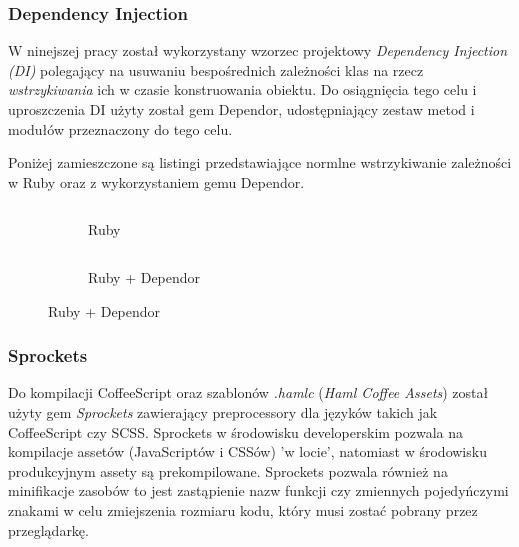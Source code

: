 \documentclass[11pt,a4paper, twoside]{article}
\begin{document}
\subsubsection{Dependency Injection}
W ninejszej pracy został wykorzystany wzorzec projektowy \emph{Dependency Injection (DI)} polegający na usuwaniu bespośrednich zależności klas na rzecz \emph{wstrzykiwania} ich w czasie konstruowania obiektu. Do osiągnięcia tego celu i uproszczenia  DI użyty został gem Dependor, udostępniający zestaw metod i modułów przeznaczony do tego celu.

Poniżej zamieszczone są listingi przedstawiające normlne wstrzykiwanie zależności w Ruby oraz z wykorzystaniem gemu Dependor.
\newline


\begin{figure}[H]
\centering
\begin{subfigure}[t]{0.45\textwidth}
\caption{Ruby}
\begin{listing}[H]
\inputminted[linenos=true]{ruby}{./src/di_ruby.rb}
\end{listing}
\end{subfigure}
\begin{subfigure}[t]{0.45\textwidth}
\caption{Ruby + Dependor}
\begin{listing}[H]
\inputminted{ruby}{./src/di_dependor.rb}
\end{listing}
\end{subfigure}
\end{figure}
\subsubsection{Sprockets}
Do kompilacji CoffeeScript oraz szablonów \emph{.hamlc} (\emph{Haml Coffee Assets}) został użyty gem \emph{Sprockets} zawierający preprocessory dla języków takich jak CoffeeScript czy SCSS. Sprockets w środowisku developerskim pozwala na kompilacje assetów (JavaScriptów i CSSów) 'w locie', natomiast w środowisku produkcyjnym assety są prekompilowane. Sprockets pozwala również na minifikacje zasobów to jest zastąpienie nazw funkcji czy zmiennych pojedyńczymi znakami w celu zmiejszenia rozmiaru kodu, który musi zostać pobrany przez przeglądarkę. 
\end{document}
